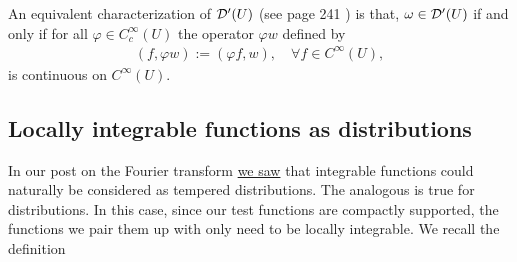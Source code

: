\documentclass[12pt]{article}
\theoremstyle{remark}
\begin{document}
An equivalent characterization of $\mathcal{D}'(U)$ (see \cite{taylor2013partial} page 241
) is that,  $\omega \in  \mathcal{D}'(U)$ if and only if for all $\varphi \in C_c^\infty(U)$ the operator $\varphi w$ defined by \begin{align}\label{equiv}
	(f, \varphi w):= (\varphi f, w), \quad\forall f \in C^\infty(U),
\end{align}
is continuous on $C^\infty(U)$.
\subsection{Locally integrable functions as distributions}%
In our post on the Fourier transform \href{https://nowheredifferentiable.com/2023-01-29-PDE-1-Fourier/#:~:text=One-,may,-verify%20that%20we}{we saw} that integrable functions could naturally be considered as tempered distributions. The analogous is true for distributions. In this case, since our test functions are compactly supported, the functions we pair them up with only need to be locally integrable. We recall the definition
\end{document}
